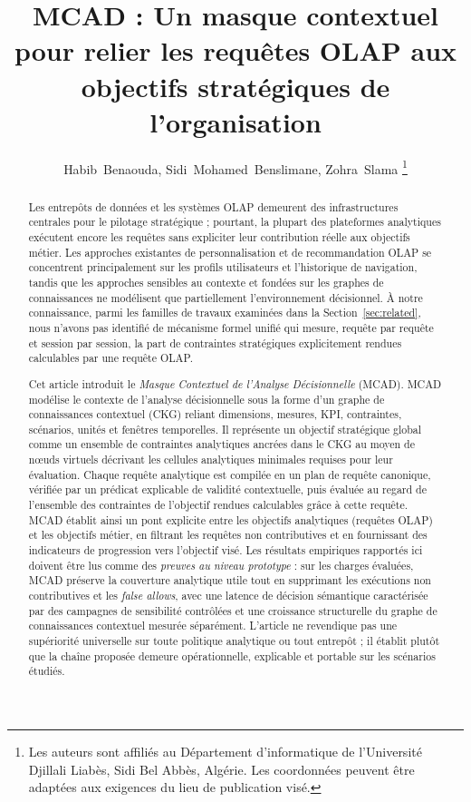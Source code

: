 \documentclass[journal]{IEEEtran}
\begin{document}
\title{MCAD : Un masque contextuel pour relier les requêtes OLAP aux objectifs stratégiques de l'organisation}

\author{Habib~Benaouda, Sidi~Mohamed~Benslimane, Zohra~Slama%
\thanks{Les auteurs sont affiliés au Département d'informatique de l'Université Djillali Liabès, Sidi Bel Abbès, Algérie. Les coordonnées peuvent être adaptées aux exigences du lieu de publication visé.}%
}

\maketitle

\begin{abstract}
Les entrepôts de données et les systèmes OLAP demeurent des infrastructures centrales pour le pilotage stratégique ; pourtant, la plupart des plateformes analytiques exécutent encore les requêtes sans expliciter leur contribution réelle aux objectifs métier. Les approches existantes de personnalisation et de recommandation OLAP se concentrent principalement sur les profils utilisateurs et l'historique de navigation, tandis que les approches sensibles au contexte et fondées sur les graphes de connaissances ne modélisent que partiellement l'environnement décisionnel. À notre connaissance, parmi les familles de travaux examinées dans la Section~\ref{sec:related}, nous n'avons pas identifié de mécanisme formel unifié qui mesure, requête par requête et session par session, la part de contraintes stratégiques explicitement rendues calculables par une requête OLAP.

Cet article introduit le \emph{Masque Contextuel de l'Analyse Décisionnelle} (MCAD). MCAD modélise le contexte de l'analyse décisionnelle sous la forme d'un graphe de connaissances contextuel (CKG) reliant dimensions, mesures, KPI, contraintes, scénarios, unités et fenêtres temporelles. Il représente un objectif stratégique global comme un ensemble de contraintes analytiques ancrées dans le CKG au moyen de nœuds virtuels décrivant les cellules analytiques minimales requises pour leur évaluation. Chaque requête analytique est compilée en un plan de requête canonique, vérifiée par un prédicat explicable de validité contextuelle, puis évaluée au regard de l'ensemble des contraintes de l'objectif rendues calculables grâce à cette requête. MCAD établit ainsi un pont explicite entre les objectifs analytiques (requêtes OLAP) et les objectifs métier, en filtrant les requêtes non contributives et en fournissant des indicateurs de progression vers l'objectif visé. Les résultats empiriques rapportés ici doivent être lus comme des \emph{preuves au niveau prototype} : sur les charges évaluées, MCAD préserve la couverture analytique utile tout en supprimant les exécutions non contributives et les \emph{false allows}, avec une latence de décision sémantique caractérisée par des campagnes de sensibilité contrôlées et une croissance structurelle du graphe de connaissances contextuel mesurée séparément. L'article ne revendique pas une supériorité universelle sur toute politique analytique ou tout entrepôt ; il établit plutôt que la chaîne proposée demeure opérationnelle, explicable et portable sur les scénarios étudiés.
\end{abstract}
\end{document}
